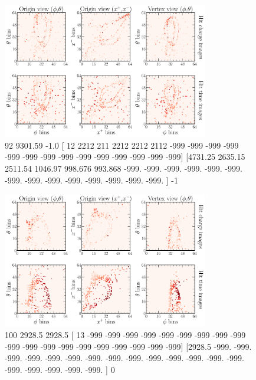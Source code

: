 \begin{figure} %
    \includegraphics[width=0.8\textwidth]{diagrams/6-cvn/chipsnet/explore_nuel_ncdis_event.pdf}
    \caption[explore nuel ncdis event short]
    {92
    9301.59
    -1.0
    [  12 2212  211 2212 2212 2112 -999 -999 -999 -999 -999 -999 -999 -999
    -999 -999 -999 -999 -999 -999]
    [4731.25  2635.15  2511.54  1046.97   998.676  993.868 -999.    -999.
    -999.    -999.    -999.    -999.    -999.    -999.    -999.    -999.
    -999.    -999.    -999.    -999.   ]
    -1
    }
    \label{fig:explore_nuel_ncdis_event}
\end{figure}

\begin{figure} %
    \includegraphics[width=0.8\textwidth]{diagrams/6-cvn/chipsnet/explore_cosmic_event.pdf}
    \caption[explore cosmic event short]
    {100
        2928.5
        2928.5
            [  13 -999 -999 -999 -999 -999 -999 -999 -999 -999 -999 -999 -999 -999
                -999 -999 -999 -999 -999 -999]
            [2928.5 -999.  -999.  -999.  -999.  -999.  -999.  -999.  -999.  -999.
                -999.  -999.  -999.  -999.  -999.  -999.  -999.  -999.  -999.  -999. ]
        0}
    \label{fig:explore_cosmic_event}
\end{figure}

